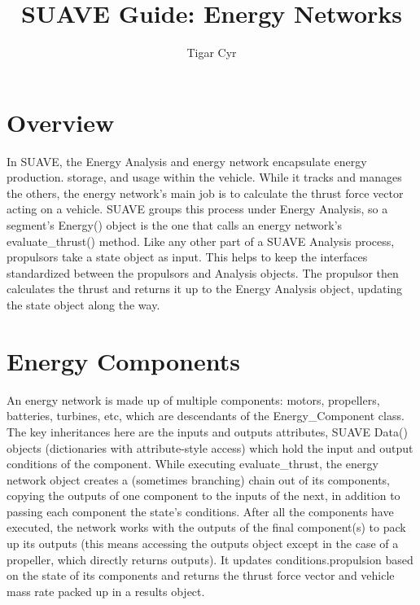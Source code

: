 \documentclass[11pt]{article} %
\title{SUAVE Guide: Energy Networks}
\author{Tigar Cyr}
\begin{document}
\maketitle

\section{Overview}


In SUAVE, the Energy Analysis and energy network encapsulate energy production. storage, and usage within the vehicle.  While it tracks and manages the others, the energy network's main job is to calculate the thrust force vector acting on a vehicle.  SUAVE groups this process under Energy Analysis, so a segment's Energy() object is the one that calls an energy network's evaluate\_thrust() method.  Like any other part of a SUAVE Analysis process, propulsors take a state object as input.  This helps to keep the interfaces standardized between the propulsors and Analysis objects.  The propulsor then calculates the thrust and returns it up to the Energy Analysis object, updating the state object along the way. 
\section{Energy Components}
\par An energy network is made up of multiple components: motors, propellers, batteries, turbines, etc, which are descendants of the Energy\_Component class.  The key inheritances here are the inputs and outputs attributes, SUAVE Data() objects (dictionaries with attribute-style access) which hold the input and output conditions of the component.  While executing evaluate\_thrust, the energy network object creates a (sometimes branching) chain out of its components, copying the outputs of one component to the inputs of the next, in addition to passing each component the state's conditions.  After all the components have executed, the network works with the outputs of the final component(s) to pack up its outputs (this means accessing the outputs object except in the case of a propeller, which directly returns outputs).  It updates conditions.propulsion based on the state of its components and returns the thrust force vector and vehicle mass rate packed up in a results object.
\end{document}
